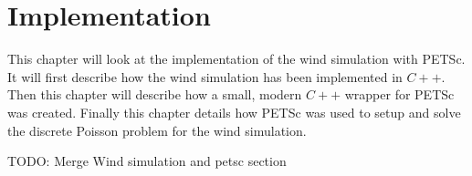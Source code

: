 \chapter{Implementation}

This chapter will look at the implementation of the wind simulation with PETSc. 
It will first describe how the wind simulation has been implemented in $C++$. Then 
this chapter will describe how a small, modern $C++$ wrapper for PETSc was created.
Finally this chapter details how PETSc was used to setup and solve the discrete 
Poisson problem for the wind simulation. 

TODO: Merge Wind simulation and petsc section






